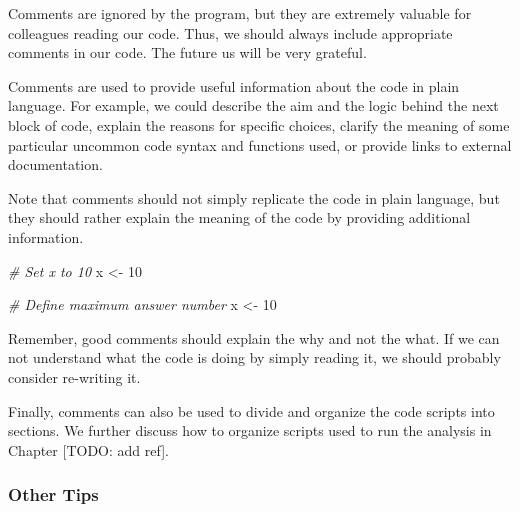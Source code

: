 \documentclass[
  11pt,
]{book}
\newenvironment{Shaded}{\begin{snugshade}}{\end{snugshade}}
\newcommand{\CommentTok}[1]{\textcolor[rgb]{0.56,0.35,0.01}{\textit{#1}}}
\newcommand{\DecValTok}[1]{\textcolor[rgb]{0.00,0.00,0.81}{#1}}
\newcommand{\NormalTok}[1]{#1}
\newcommand{\OtherTok}[1]{\textcolor[rgb]{0.56,0.35,0.01}{#1}}
\newenvironment{code-tex-bad}
  {\begingroup\definecolor{shadecolor}{RGB}{255, 189, 185}}
  {\endgroup}
\newenvironment{code-tex-good}
  {\begingroup\definecolor{shadecolor}{RGB}{224, 240, 227}}
  {\endgroup}
\begin{document}
Comments are ignored by the program, but they are extremely valuable for colleagues reading our code. Thus, we should always include appropriate comments in our code. The future us will be very grateful.

Comments are used to provide useful information about the code in plain language. For example, we could describe the aim and the logic behind the next block of code, explain the reasons for specific choices, clarify the meaning of some particular uncommon code syntax and functions used, or provide links to external documentation.

Note that comments should not simply replicate the code in plain language, but they should rather explain the meaning of the code by providing additional information.

\begin{code-tex-bad}

\begin{Shaded}
\begin{Highlighting}[]
\CommentTok{\# Set x to 10}
\NormalTok{x }\OtherTok{\textless{}{-}} \DecValTok{10} 
\end{Highlighting}
\end{Shaded}

\end{code-tex-bad}

\begin{code-tex-good}

\begin{Shaded}
\begin{Highlighting}[]
\CommentTok{\# Define maximum answer number}
\NormalTok{x }\OtherTok{\textless{}{-}} \DecValTok{10}
\end{Highlighting}
\end{Shaded}

\end{code-tex-good}

Remember, good comments should explain the why and not the what. If we can not understand what the code is doing by simply reading it, we should probably consider re-writing it.

Finally, comments can also be used to divide and organize the code scripts into sections. We further discuss how to organize scripts used to run the analysis in Chapter {[}TODO: add ref{]}.

\hypertarget{other-tips}{%
\subsubsection{Other Tips}\label{other-tips}}
\end{document}
